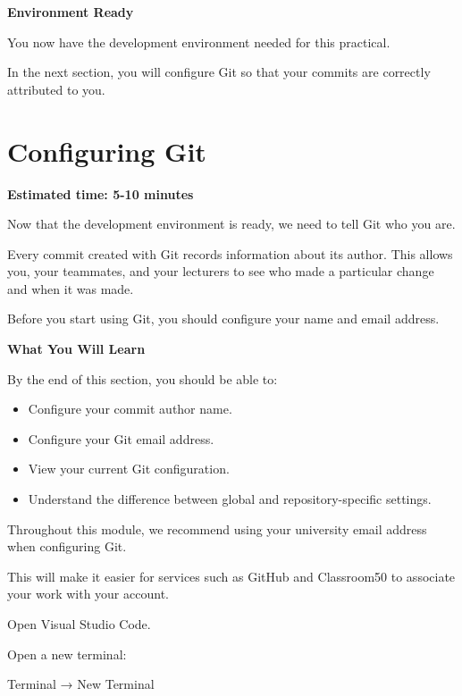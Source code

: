 \documentclass{csc2059practical}
\begin{document}
\begin{wrapupbox}
\textbf{Environment Ready}\par
\medskip

You now have the development environment needed for this practical.

In the next section, you will configure Git so that your commits are correctly attributed to you.
\end{wrapupbox}

\section{Configuring Git}
\begin{infobox}
\textbf{Estimated time: 5-10 minutes}
\end{infobox}
Now that the development environment is ready, we need to tell Git who you are.

Every commit created with Git records information about its author. This allows you, your teammates, and your lecturers to see who made a particular change and when it was made.

Before you start using Git, you should configure your name and email address.

\begin{learningoutcomes}
\textbf{What You Will Learn}\par
\medskip
By the end of this section, you should be able to:

\begin{itemize}
  \item Configure your commit author name.
  \item Configure your Git email address.
  \item View your current Git configuration.
  \item Understand the difference between global and repository-specific settings.
\end{itemize}
\end{learningoutcomes}
\begin{importantnote}
Throughout this module, we recommend using your university email address when configuring Git.

This will make it easier for services such as GitHub and Classroom50 to associate your work with your account.
\end{importantnote}

Open Visual Studio Code.

Open a new terminal:

Terminal → New Terminal
\end{document}
